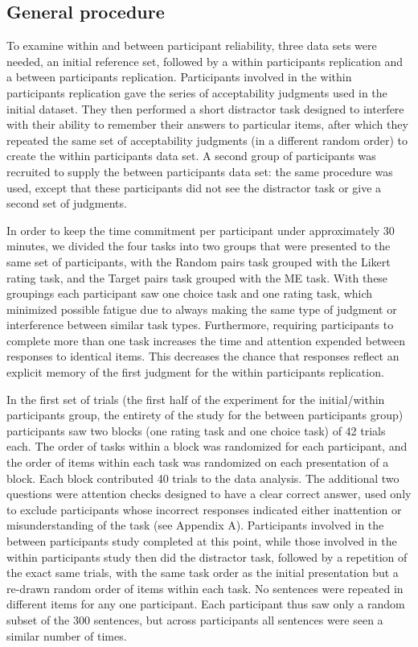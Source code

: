 \documentclass[doc]{apa6}
\newcommand{\targchoice}{{\sc Target pairs}}
\newcommand{\rndchoice}{{\sc Random pairs}}
\newcommand{\ME}{{\sc ME}}%
\newcommand{\likert}{{\sc Likert}}
\newcommand{\choicetask}{choice task}
\newcommand{\ratingtask}{rating task}
\newcommand{\initial}{{\sc initial}}
\newcommand{\withinppnt}{{\sc within participants}}
\newcommand{\betweenppnt}{{\sc between participants}}
\begin{document}
\subsection{General procedure}

To examine within and between participant reliability, three data sets were needed, an \initial{} reference set, followed by a \withinppnt{} replication and a \betweenppnt{} replication. Participants involved in the \withinppnt{} replication gave the series of acceptability judgments used in the \initial{} dataset. They then performed a short distractor task designed to interfere with their ability to remember their answers to particular items, after which they repeated the same set of acceptability judgments (in a different random order) to create the \withinppnt{} data set. A second group of participants was recruited to supply the \betweenppnt{} data set: the same procedure was used, except that these participants did not see the distractor task or give a second set of judgments.

In order to keep the time commitment per participant under approximately 30 minutes, we divided the four tasks into two groups that were presented to the same set of participants, with the \rndchoice{} task grouped with the \likert{} rating task, and the \targchoice{} task grouped with the \ME{} task.
With these groupings each participant saw one \choicetask{ }and one \ratingtask, which minimized possible fatigue due to always making the same type of judgment or interference between similar task types.
Furthermore, requiring participants to complete more than one task increases the time and attention expended between responses to identical items. This decreases the chance that responses reflect an explicit memory of the first judgment for the \withinppnt{} replication.


In the first set of trials (the first half of the experiment for the {\initial}/{\withinppnt} group, the entirety of the study for the \betweenppnt{} group) participants saw two blocks (one \ratingtask{} and one \choicetask) of 42 trials each.
The order of tasks within a block was randomized for each participant, and the order of items within each task was randomized on each presentation of a block.
Each block contributed 40 trials to the data analysis. The additional two questions were attention checks designed to have a clear correct answer, used only to exclude participants whose incorrect responses indicated either inattention or misunderstanding of the task (see Appendix A). Participants involved in the \betweenppnt{} study completed at this point, while those involved in the \withinppnt{} study then did the distractor task, followed by a repetition of the exact same trials, with the same task order as the initial presentation but a re-drawn random order of items within each task. No sentences were repeated in different items for any one participant.
Each participant thus saw only a random subset of the 300 sentences, but across participants all sentences were seen a similar number of times.
\end{document}
